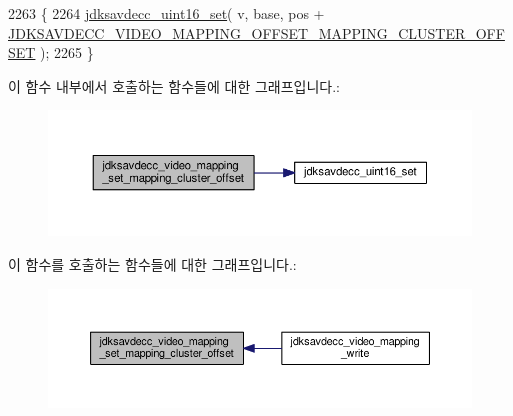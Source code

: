 \begin{DoxyCode}
2263 \{
2264     \hyperlink{group__endian_ga14b9eeadc05f94334096c127c955a60b}{jdksavdecc\_uint16\_set}( v, base, pos + 
      \hyperlink{group__video__mapping_gaf8730c34ed728d0be2bd774fddea75d3}{JDKSAVDECC\_VIDEO\_MAPPING\_OFFSET\_MAPPING\_CLUSTER\_OFFSET}
       );
2265 \}
\end{DoxyCode}


이 함수 내부에서 호출하는 함수들에 대한 그래프입니다.\+:
\nopagebreak
\begin{figure}[H]
\begin{center}
\leavevmode
\includegraphics[width=350pt]{group__video__mapping_ga32152a52baa0793811420db284a10a92_cgraph}
\end{center}
\end{figure}




이 함수를 호출하는 함수들에 대한 그래프입니다.\+:
\nopagebreak
\begin{figure}[H]
\begin{center}
\leavevmode
\includegraphics[width=350pt]{group__video__mapping_ga32152a52baa0793811420db284a10a92_icgraph}
\end{center}
\end{figure}



